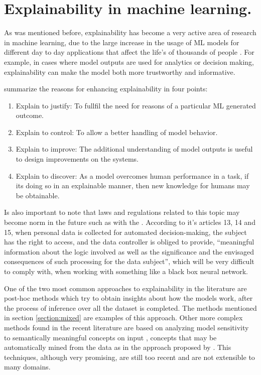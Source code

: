 \section{ Explainability in machine learning.}

As was mentioned before, explainability has become a very active area of research
in machine learning, due to the large increase in the usage of ML models
for different day to day applications that affect the life's of thousands of people
\cite{ras_explanation}. For example, in cases where model outputs are used for analytics or decision
making, explainability can make the model both more trustworthy and informative.

 summarize the reasons for enhancing explainability in four points:

\begin{enumerate}
	\item Explain to justify: To fullfil the need for reasons of a particular ML
	generated outcome.
	\item Explain to control: To allow a better handling of model behavior.
	\item Explain to improve: The additional understanding of model outputs is useful
	to design improvements on the systems.
	\item Explain to discover: As a model overcomes human performance in a task, if its
	doing so in an explainable manner, then new knowledge for humans may be obtainable.

\end{enumerate}

Is also important to note that laws and regulations related to this topic may become norm
in the future such as with the . According to it's articles
13, 14 and 15, when personal data is collected for automated decision-making,
the subject has the right to access, and the data controller is obliged to provide,
“meaningful information about the logic involved  as well as the significance and the envisaged
consequences of such processing for the data subject”, which will be very difficult to comply with,
when working with something like a black box neural network.

One of the two most common approaches to explainability in the literature are post-hoc methods
\cite{adadi_xai} which try to obtain insights about how the models work, after the process of
inference over all the dataset is completed. The methods mentioned in section
\ref{section:mixed} are examples of this approach. Other more complex methods found in the recent literature
are based on analyzing model sensitivity to semantically meaningful concepts on input \cite{kim_tcav, shi_concept},
concepts that may be automatically mined from the data as in the approach proposed by . This techniques, although
very promising, are still too recent and are not extensible to many domains.

